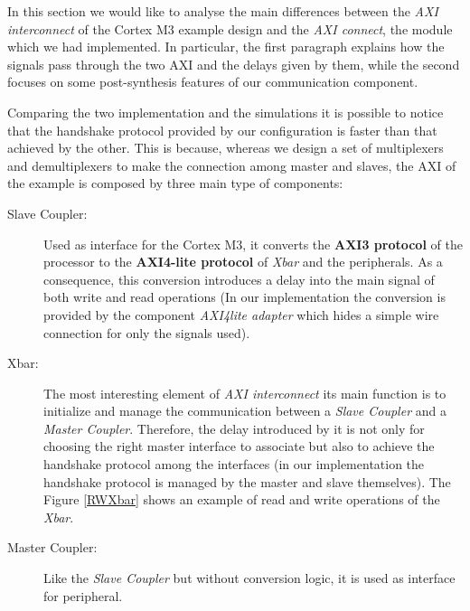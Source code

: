In this section we would like to analyse the main differences between the \textit{AXI interconnect} of the Cortex M3 example design and the \textit{AXI connect}, the module which we had implemented.
In particular, the first paragraph explains how the signals pass through the two AXI and the delays given by them, while the second focuses on some post-synthesis features of our communication component.

{}

Comparing the two implementation and the simulations it is possible to notice that the handshake protocol provided by our configuration is faster than that achieved by the other.
This is because, whereas we design a set of multiplexers and demultiplexers to make the connection among master and slaves, the AXI of the example is composed by three main type of components:

{\flushleft
\begin{description}

\item[Slave Coupler:]Used as interface for the Cortex M3, it converts the \textbf{AXI3 protocol} of the processor to the \textbf{AXI4-lite protocol} of \textit{Xbar} and the peripherals. As a consequence, this conversion introduces a delay into the main signal of both write and read operations (In our implementation the conversion is provided by the component \textit{AXI4lite adapter} which hides a simple wire connection for only the signals used).

\item[Xbar:]The most interesting element of \textit{AXI interconnect} its main function is to initialize and manage the communication between a \textit{Slave Coupler} and a \textit{Master Coupler}. Therefore, the delay introduced by it is not only for choosing the right master interface to associate but also to achieve the handshake protocol among the interfaces (in our implementation the handshake protocol is managed by the master and slave themselves).
The Figure \ref{RWXbar} shows an example of read and write operations of the \textit{Xbar}.

\item[Master Coupler:]Like the \textit{Slave Coupler} but without conversion logic, it is used as interface for peripheral.

\end{description}
}


